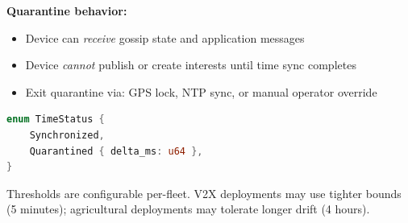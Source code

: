 \textbf{Quarantine behavior:}
\begin{itemize}[nosep]
    \item Device can \emph{receive} gossip state and application messages
    \item Device \emph{cannot} publish or create interests until time sync completes
    \item Exit quarantine via: GPS lock, NTP sync, or manual operator override
\end{itemize}

\begin{lstlisting}[language=Rust]
enum TimeStatus {
    Synchronized,
    Quarantined { delta_ms: u64 },
}
\end{lstlisting}

Thresholds are configurable per-fleet. V2X deployments may use tighter bounds (5 minutes); agricultural deployments may tolerate longer drift (4 hours).

